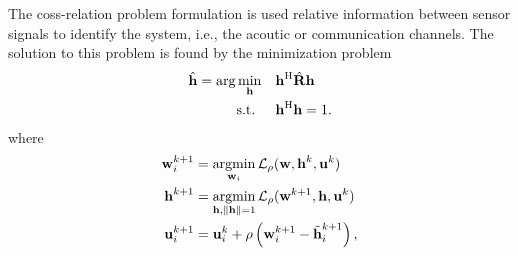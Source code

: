 \documentclass{article}
\begin{document}
The coss-relation problem formulation is used relative information between sensor signals to identify the system, i.e., the acoutic or communication channels.
The solution to this problem is found by the minimization problem
\begin{equation}
  \begin{aligned}
      \hat{\bm{\mathrm{h}}} = \arg \min_{\bm{\mathrm{h}}} \quad &\bm{\mathrm{h}}^{\mathrm{H}} \hat{\bm{\mathrm{R}}} \bm{\mathrm{h}} \\
      \text{s.t. } \quad &\bm{\mathrm{h}}^{\mathrm{H}} \bm{\mathrm{h}} = 1.
  \end{aligned}\label{eq:frequency_domain:min_prob}
\end{equation}
where 
\begin{align}
  \bm{\mathrm{w}}_i^{k+1} &= \underset{\bm{\mathrm{w}}_i}{\operatorname{argmin}} \, \mathcal{L}_{\rho} (\bm{\mathrm{w}},\bm{\mathrm{h}}^k,\bm{\mathrm{u}}^k)\label{eq:general_consensus_admm:local}\\
  \bm{\mathrm{h}}^{k+1} &= \underset{\bm{\mathrm{h}}, \|\bm{\mathrm{h}}\| = 1}{\operatorname{argmin}}\, \mathcal{L}_{\rho} (\bm{\mathrm{w}}^{k+1},\bm{\mathrm{h}},\bm{\mathrm{u}}^k)\label{eq:general_consensus_admm:global}\\
  \bm{\mathrm{u}}_i^{k+1} &= \bm{\mathrm{u}}_i^{k} + \rho \left( \bm{\mathrm{w}}_i^{k+1} - \tilde{\bm{\mathrm{h}}}_i^{k+1} \right),\label{eq:general_consensus_admm:dual}
\end{align}
\end{document}
